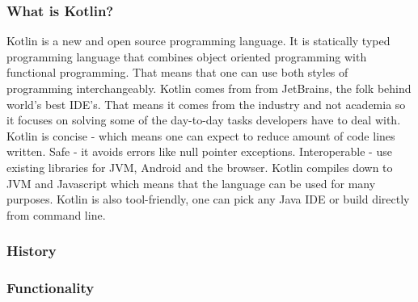 \subsubsection{What is Kotlin?}
Kotlin is a new and open source programming language. It is statically typed programming language that combines object oriented programming with functional programming. That means that one can use both styles of programming interchangeably. Kotlin comes from from JetBrains, the folk behind world's best IDE's. That means it comes from the industry and not academia so it focuses on solving some of the day-to-day tasks developers have to deal with. Kotlin is concise - which means one can expect to reduce amount of code lines written. Safe - it avoids errors like null pointer exceptions. Interoperable - use existing libraries for JVM, Android and the browser. Kotlin compiles down to JVM and Javascript which means that the language can be used for many purposes. Kotlin is also tool-friendly, one can pick any Java IDE or build directly from command line.
\subsubsection{History}
\subsubsection{Functionality} 
